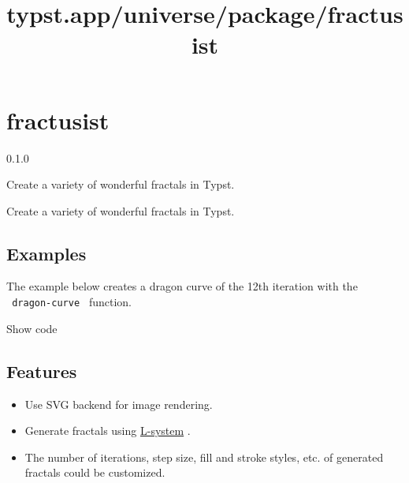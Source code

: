 \title{typst.app/universe/package/fractusist}

\label{banner}
\section{fractusist}\label{fractusist}

{ 0.1.0 }

Create a variety of wonderful fractals in Typst.

\label{readme}
Create a variety of wonderful fractals in Typst.

\subsection{Examples}\label{examples}

The example below creates a dragon curve of the 12th iteration with the
\texttt{\ dragon-curve\ } function.


Show code

\begin{Shaded}
\begin{Highlighting}[]

\NormalTok{  )}
\NormalTok{)}
\end{Highlighting}
\end{Shaded}

\subsection{Features}\label{features}

\begin{itemize}
\tightlist
\item
  Use SVG backend for image rendering.
\item
  Generate fractals using
  \href{https://en.wikipedia.org/wiki/L-system}{L-system} .
\item
  The number of iterations, step size, fill and stroke styles, etc. of
  generated fractals could be customized.
\end{itemize}

